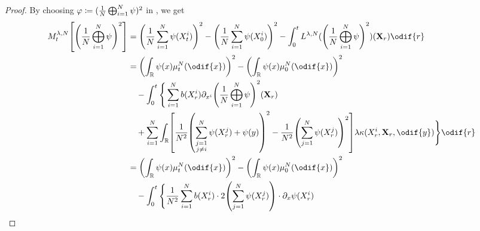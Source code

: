 \begin{proof}
  By choosing \(\varphi \coloneqq \lparen \frac{1}{N} \bigoplus_{i=1}^N \psi \rparen^2\) in , we get
  \begin{equation}
    \begin{split}
      M_t^{\lambda, N}\sbr*{ \br*{ \frac{1}{N} \bigoplus_{i=1}^N \psi }^2 }
                                               & = \br*{\frac{1}{N} \sum_{i=1}^N \psi(X_t^i)}^2 - \br*{\frac{1}{N} \sum_{i=1}^N \psi(X_0^i)}^2
      - \int_0^t L^{\lambda, N}(\br*{ \frac{1}{N} \bigoplus_{i=1}^N \psi }^2) (\bm{X}_r) \odif{r}                                                                                                                                                                                                                                                           \\
                                               & = \br*{ \int_\potspace \psi(x) \mu_t^N(\odif{x}) }^2 - \br*{ \int_\potspace \psi(x) \mu_0^N(\odif{x}) }^2                                                                                                                                                                            \\
                                               & \quad {} - \int_0^t \Bigg\{ \sum_{i=1}^N b(X_r^i) \partial_{x^i}\br*{ \frac{1}{N} \bigoplus_{i=1}^N \psi }^2 (\bm{X}_r)                                                                                                                                                                                    \\
                                               & \quad {} + \sum_{i=1}^N \int_\potspace \sbr*{  \frac{1}{N^2} \br*{ \sum_{\substack{j=1                                                                                                                                                                                                                     \\ j \neq i}}^N \psi(X_r^j) + \psi(y) }^2 - \frac{1}{N^2} \br*{ \sum_{j=1}^N \psi(X_r^j) }^2 } \lambda \kappa(X_r^i,\bm{X}_r,\odif{y}) \Bigg\} \odif{r} \\
                                               & = \br*{ \int_\potspace \psi(x) \mu_t^N(\odif{x}) }^2 - \br*{ \int_\potspace \psi(x) \mu_0^N(\odif{x}) }^2                                                                                                                                                                            \\
                                               & \quad {} - \int_0^t \Bigg\{ \frac{1}{N^2} \sum_{i=1}^N b(X_r^i) \cdot 2 \br*{ \sum_{j=1}^N \psi(X_r^j) } \cdot \partial_x \psi(X_r^i)                                                                                                                                                                      \\

\end{split}
\end{equation}
\end{proof}
